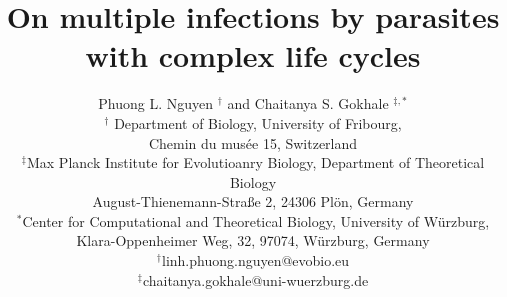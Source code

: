 \documentclass[a4paper]{scrartcl}
\begin{document}
\sffamily
\title{
On multiple infections by parasites with complex life cycles
}   
\author{Phuong L. Nguyen $^{\dag}$ and Chaitanya S. Gokhale $^{\ddag,\ast}$\\
\small{$^\dag$ Department of Biology, University of Fribourg,}\\
\small{Chemin du mus\'{e}e 15, Switzerland}\\
\small{$^\ddag$Max Planck Institute for Evolutioanry Biology, Department of Theoretical Biology}\\
\small{August-Thienemann-Stra{\ss}e 2, 24306 Pl\"{o}n, Germany}\\
\small{$^\ast$Center for Computational and Theoretical Biology, University of W\"{u}rzburg,}\\
\small{Klara-Oppenheimer Weg, 32, 97074, W\"{u}rzburg, Germany}\\
\small{$^\dag$linh.phuong.nguyen@evobio.eu}\\
\small{$^\ddag$chaitanya.gokhale@uni-wuerzburg.de}
}

\date{}
\maketitle


\linenumbers


%
\end{document}
